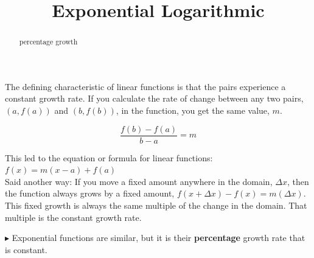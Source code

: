 \documentclass{ximera}
\title{Exponential Logarithmic}
\begin{document}
\begin{abstract}
percentage growth
\end{abstract}
\maketitle




The defining characteristic of linear functions is that the pairs experience a constant growth rate. If you calculate the rate of change between any two pairs, $(a, f(a))$ and $(b, f(b))$, in the function, you get the same value, $m$.


\[   \frac{f(b)-f(a)}{b-a} = m       \]

This led to the equation or formula for linear functions:  $f(x) = m(x-a) + f(a)$ \\


Said another way:  If you move a fixed amount anywhere in the domain, $\Delta x$, then the function always grows by a fixed amount, $f(x + \Delta x) - f(x) = m(\Delta x)$. This fixed growth is always the same multiple of the change in the domain. That multiple is the constant growth rate.


$\blacktriangleright$ Exponential functions are similar, but it is their \textbf{percentage} growth rate that is constant.   \\
\end{document}
